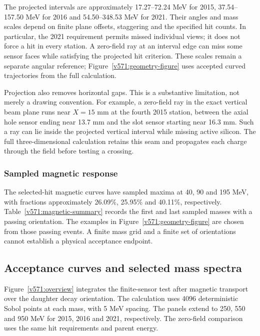 The projected intervals are approximately 17.27--72.24 MeV for 2015,
37.54--157.50 MeV for 2016 and 54.50--348.53 MeV for 2021. Their angles and
mass scales depend on finite plane offsets, staggering and the specified hit
counts. In particular, the 2021 requirement permits missed individual views;
it does not force a hit in every station. A zero-field ray at an interval
edge can miss some sensor faces while satisfying the projected hit criterion.
These scales remain a separate angular reference; Figure~\ref{v571:geometry-figure}
uses accepted curved trajectories from the full calculation.

Projection also removes horizontal gaps. This is a substantive limitation,
not merely a drawing convention. For example, a zero-field ray in the exact
vertical beam plane runs near $X=15$ mm at the fourth 2015 station, between
the axial hole sensor ending near 13.7 mm and the slot sensor starting near
16.3 mm. Such a ray can lie inside the projected vertical interval while
missing active silicon. The full three-dimensional calculation retains this
seam and propagates each charge through the field before testing a crossing.

\subsubsection{Sampled magnetic response}
\label{v571:sampled-response}
The selected-hit magnetic curves have sampled maxima at 40, 90 and 195 MeV,
with fractions approximately 26.09\%, 25.95\% and 40.11\%, respectively.
Table~\ref{v571:magnetic-summary} records the first and last sampled masses
with a passing orientation. The examples in Figure~\ref{v571:geometry-figure} are
chosen from those passing events. A finite mass grid and a finite set of
orientations cannot establish a physical acceptance endpoint.




\subsection{Acceptance curves and selected mass spectra}
\label{v571:results}
Figure~\ref{v571:overview} integrates the finite-sensor test
after magnetic transport over the daughter decay orientation. The calculation
uses 4096 deterministic Sobol points at each mass, with 5 MeV spacing. The
panels extend to 250, 550 and 950 MeV for 2015, 2016 and 2021, respectively.
The zero-field comparison uses the same hit requirements and parent energy.


